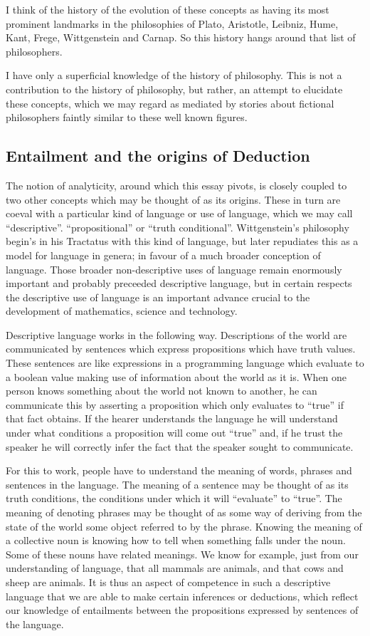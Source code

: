 \documentclass[10pt,titlepage]{article}
\begin{document}
I think of the history of the evolution of these concepts as having its most prominent landmarks in the philosophies of Plato, Aristotle, Leibniz, Hume, Kant, Frege, Wittgenstein and Carnap.
So this history hangs around that list of philosophers.

I have only a superficial knowledge of the history of philosophy.
This is not a contribution to the history of philosophy, but rather, an attempt to elucidate these concepts, which we may regard as mediated by stories about fictional philosophers faintly similar to these well known figures.

\subsection{Entailment and the origins of Deduction}

The notion of analyticity, around which this essay pivots, is closely coupled to two other concepts which may be thought of as its origins.
These in turn are coeval with a particular kind of language or use of language, which we may call ``descriptive''. ``propositional'' or ``truth conditional''.
Wittgenstein's philosophy begin's in his Tractatus with this kind of language, but later repudiates this as a model for language in genera; in favour of a much broader conception of language.
Those broader non-descriptive uses of language remain enormously important and probably preceeded descriptive language, but in certain respects the descriptive use of language is an important advance crucial to the development of mathematics, science and technology.

Descriptive language works in the following way.
Descriptions of the world are communicated by sentences which express propositions which have truth values.
These sentences are like expressions in a programming language which evaluate to a boolean value making use of information about the world as it is.
When one person knows something about the world not known to another, he can communicate this by asserting a proposition which only evaluates to ``true'' if that fact obtains.
If the hearer understands the language he will understand under what conditions a proposition will come out ``true'' and, if he trust the speaker he will correctly infer the fact that the speaker sought to communicate.

For this to work, people have to understand the meaning of words, phrases and sentences in the language.
The meaning of a sentence may be thought of as its truth conditions, the conditions under which it will ``evaluate'' to ``true''.
The meaning of denoting phrases may be thought of as some way of deriving from the state of the world some object referred to by the phrase.
Knowing the meaning of a collective noun is knowing how to tell when something falls under the noun.
Some of these nouns have related meanings.
We know for example, just from our understanding of language, that all mammals are animals, and that cows and sheep are animals.
It is thus an aspect of competence in such a descriptive language that we are able to make certain inferences or deductions, which reflect our knowledge of entailments between the propositions expressed by sentences of the language.
\end{document}
